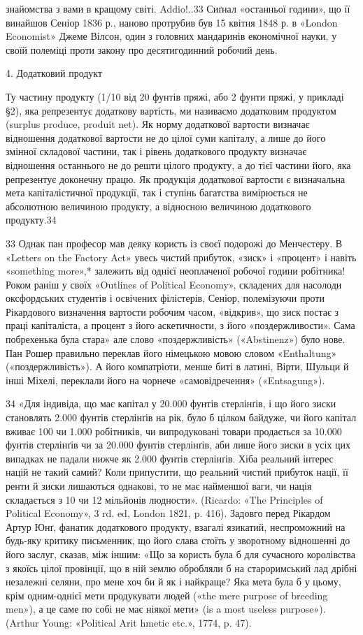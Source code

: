 знайомства з вами в кращому світі. Addio!..33 Сиґнал «останньої години», що її винайшов Сеніор 1836
р., наново протрубив був 15 квітня 1848 р. в «London Economist» Джеме Вілсон, один з головних
мандаринів економічної науки, у своїй полеміці проти
закону про десятигодинний робочий день.

4. Додатковий продукт

Ту частину продукту (1/10 від 20 фунтів пряжі, або 2 фунти пряжі, у прикладі §2), яка репрезентує
додаткову вартість, ми
називаємо додатковим продуктом (surplus produce, produit net). Як норму додаткової вартости визначає
відношення додаткової
вартости не до цілої суми капіталу, а лише до його змінної складової частини, так і рівень
додаткового продукту визначає відношення останнього не до решти цілого продукту, а до тієї частини
його, яка репрезентує доконечну працю. Як продукція додаткової вартости є визначальна мета
капіталістичної продукції, так і ступінь багатства вимірюється не абсолютною величиною
продукту, а відносною величиною додаткового продукту.34

33    Однак пан професор мав деяку користь із своєї подорожі до Менчестеру. В «Letters on the
Factory Act» увесь чистий прибуток, «зиск» і «процент» і навіть «something more»,* залежить від
однієї неоплаченої
робочої години робітника! Роком раніш у своїх «Outlines of Political Economy», складених для
насолоди оксфордських студентів і освічених філістерів, Сеніор, полемізуючи проти Рікардового
визначення вартости робочим часом, «відкрив», що зиск постає з праці капіталіста, а процент з його
аскетичности, з його «поздержливости». Сама побрехенька була стара» але слово «поздержливість»
(«Abstinenz») було нове. Пан Рошер правильно переклав його німецькою мовою словом «Enthaltung»
(«поздержливість»). А його компатріоти, менше биті в латині, Вірти, Шульци
й інші Міхелі, переклали його на чорнече «самовідречення» («Entsagung»).

34 «Для індивіда, що має капітал у 20.000 фунтів стерлінґів, і що його зиски становлять 2.000 фунтів
стерлінґів на рік, було б цілком байдуже, чи його капітал вживає 100 чи 1.000 робітників, чи
випродуковані товари продається за 10.000 фунтів стерлінґів чи за 20.000 фунтів стерлінґів, аби лише
його зиски в усіх цих випадках не падали нижче як 2.000 фунтів
стерлінґів. Хіба реальний інтерес націй не такий самий? Коли припустити, що реальний чистий прибуток
нації, її ренти й зиски лишаються однакові, то не має найменшої ваги, чи нація складається з 10 чи
12 мільйонів людности». (Ricardo: «The Principles of Political Economy», 3 rd. ed, London 1821, p.
416). Задовго перед Рікардом Артур Юнґ, фанатик додаткового продукту, взагалі язикатий, неспроможний
на будь-яку критику письменник, що його слава стоїть у зворотному відношенні
до його заслуг, сказав, між іншим: «Що за користь була б для сучасного королівства з якоїсь цілої
провінції, що в ній землю обробляли б на староримський лад дрібні незалежні селяни, про мене хоч би
й як і найкраще? Яка мета була б у цьому, крім одним-однієї мети продукувати людей
(«the mere purpose of breeding men»), а це саме по собі не має ніякої мети» (is a most useless
purpose»). (Arthur Young: «Political Arit hmetic etc.», 1774, p. 47).

